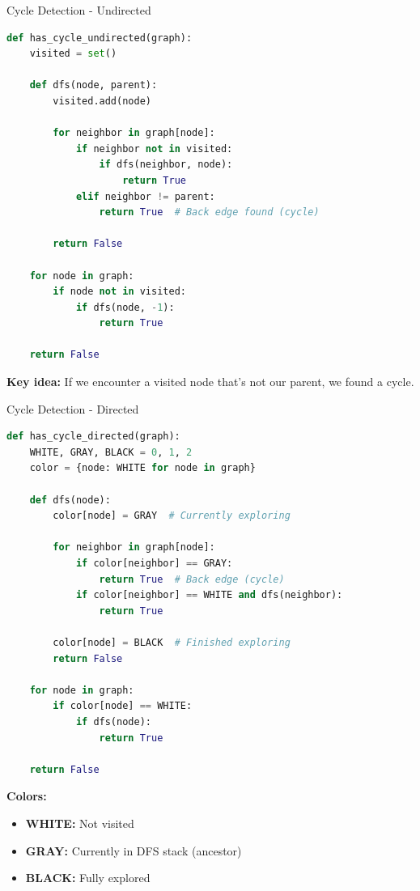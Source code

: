 \documentclass[aspectratio=169]{beamer}
\begin{document}
\begin{frame}[fragile]{Cycle Detection - Undirected}
  \begin{lstlisting}[language=Python, basicstyle=\ttfamily\small]
def has_cycle_undirected(graph):
    visited = set()

    def dfs(node, parent):
        visited.add(node)

        for neighbor in graph[node]:
            if neighbor not in visited:
                if dfs(neighbor, node):
                    return True
            elif neighbor != parent:
                return True  # Back edge found (cycle)

        return False

    for node in graph:
        if node not in visited:
            if dfs(node, -1):
                return True

    return False
  \end{lstlisting}

  \vspace{0.3cm}
  \textbf{Key idea:} If we encounter a visited node that's not our parent, we found a cycle.
\end{frame}

\begin{frame}[fragile]{Cycle Detection - Directed}
  \begin{lstlisting}[language=Python, basicstyle=\ttfamily\footnotesize]
def has_cycle_directed(graph):
    WHITE, GRAY, BLACK = 0, 1, 2
    color = {node: WHITE for node in graph}

    def dfs(node):
        color[node] = GRAY  # Currently exploring

        for neighbor in graph[node]:
            if color[neighbor] == GRAY:
                return True  # Back edge (cycle)
            if color[neighbor] == WHITE and dfs(neighbor):
                return True

        color[node] = BLACK  # Finished exploring
        return False

    for node in graph:
        if color[node] == WHITE:
            if dfs(node):
                return True

    return False
  \end{lstlisting}

  \vspace{0.3cm}
  \textbf{Colors:}
  \begin{itemize}
    \item \textbf{WHITE:} Not visited
    \item \textbf{GRAY:} Currently in DFS stack (ancestor)
    \item \textbf{BLACK:} Fully explored
  \end{itemize}
\end{frame}
\end{document}

